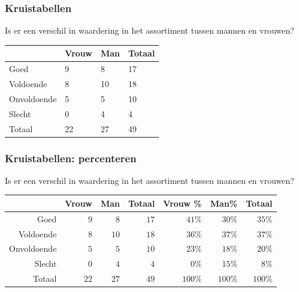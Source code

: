 \begin{frame}
	\frametitle{Kruistabellen}
	Is er een verschil in waardering in het assortiment tussen mannen en vrouwen?
	
	\begin{table}[h]
		\begin{tabular}{l||l|l||l}
			& Vrouw & Man & Totaal \\ \hline \hline
			Goed        & 9     & 8   & 17     \\
			Voldoende   & 8     & 10  & 18     \\
			Onvoldoende & 5     & 5   & 10     \\
			Slecht      & 0     & 4   & 4      \\ \hline \hline
			Totaal      & 22    & 27  & 49     \\
		\end{tabular}
	\end{table}
\end{frame}

\begin{frame}
	\frametitle{Kruistabellen: percenteren}
	Is er een verschil in waardering in het assortiment tussen mannen en vrouwen?
	\begin{adjustwidth}{-1.5em}{-1.5em}
		\begin{table}[h] \centering
			\begin{tabular}{@{}rrrrrrr@{}} \toprule
				& Vrouw & Man & Totaal & Vrouw \% & Man\%   & Totaal  \\ \midrule
				Goed        & $9$     & $8$  & $17$     & $41$\%  & $30$\%  & $35$\% \\
				Voldoende   & $8$     & $10$ & $18$     & $36$\%  & $37$\%  & $37$\% \\
				Onvoldoende & $5$     & $5$  & $10$     & $23$\%  & $18$\%  & $20$\% \\
				Slecht      & $0$     & $4$  & $4$      & $0$\%   & $15$\%  & $8$\%  \\
				Totaal      & $22$    & $27$ & $49$     & $100$\% & $100$\% & $100$\%\\
				\bottomrule
			\end{tabular}
		\end{table}
	\end{adjustwidth}
\end{frame}


